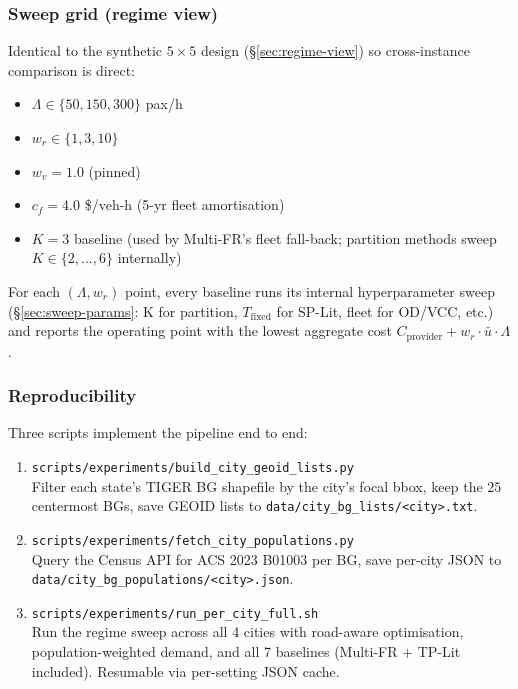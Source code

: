 \subsubsection{Sweep grid (regime view)}

Identical to the synthetic $5\times5$ design (\S\ref{sec:regime-view})
so cross-instance comparison is direct:

\begin{itemize}
  \item $\Lambda \in \{50, 150, 300\}$ pax/h
  \item $w_r \in \{1, 3, 10\}$
  \item $w_v = 1.0$ (pinned)
  \item $c_f = 4.0$ \$/veh-h (5-yr fleet amortisation)
  \item $K = 3$ baseline (used by Multi-FR's fleet fall-back; partition methods sweep $K \in \{2,...,6\}$ internally)
\end{itemize}

For each $(\Lambda, w_r)$ point, every baseline runs its
internal hyperparameter sweep
(\S\ref{sec:sweep-params}: K for partition, $T_{\mathrm{fixed}}$ for
SP-Lit, fleet for OD/VCC, etc.) and reports the operating point
with the lowest aggregate cost
$C_{\mathrm{provider}} + w_r \cdot \bar{u} \cdot \Lambda$.

\subsubsection{Reproducibility}

Three scripts implement the pipeline end to end:

\begin{enumerate}
  \item \texttt{scripts/experiments/build\_city\_geoid\_lists.py} \\
    Filter each state's TIGER BG shapefile by the city's focal bbox,
    keep the $25$ centermost BGs, save GEOID lists to
    \verb|data/city_bg_lists/<city>.txt|.
  \item \texttt{scripts/experiments/fetch\_city\_populations.py} \\
    Query the Census API for ACS 2023 B01003 per BG, save
    per-city JSON to \verb|data/city_bg_populations/<city>.json|.
  \item \texttt{scripts/experiments/run\_per\_city\_full.sh} \\
    Run the regime sweep across all 4 cities with road-aware
    optimisation, population-weighted demand, and all 7 baselines
    (Multi-FR + TP-Lit included). Resumable via per-setting JSON
    cache.
\end{enumerate}

